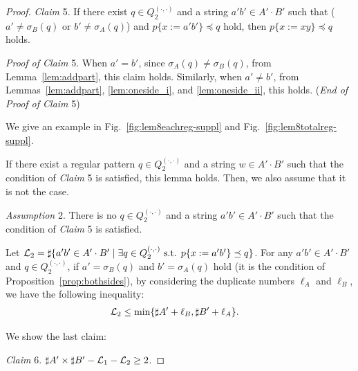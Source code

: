 \begin{proof}
\smallskip

\noindent
\textit{Claim} 5.
If there exist $q \in Q_{2}^{(\cdot,\cdot)}$ and a string $a'b' \in A'\cdot B'$ such that ($a' \not= \sigma_{B}(q)$ or $b' \not= \sigma_{A}(q)$) and $p\{x:=a'b'\} \preceq q$ hold, then $p\{x:=xy\} \preceq q$ holds.
 
\smallskip

\noindent
\textit{Proof of Claim} 5.
When $a'=b'$, since $\sigma_{A}(q) \not= \sigma_{B}(q)$, from Lemma~\ref{lem:addpart}, this claim holds. Similarly, when $a' \not = b'$, from Lemmas~\ref{lem:addpart}, \ref{lem:oneside_i}, and \ref{lem:oneside_ii}, this holds.  (\textit{End of Proof of Claim} 5)

\noindent
We give an example in Fig.~\ref{fig:lem8eachreg-suppl} and Fig.~\ref{fig:lem8totalreg-suppl}.


\smallskip

\noindent
If there exist a regular pattern $q \in Q_{2}^{(\cdot,\cdot)}$ and a string $w \in A'\cdot B'$ such that the condition of \textit{Claim} 5 is satisfied, this lemma holds. Then, we also assume that it is not the case.

\smallskip

\noindent
\textit{Assumption} 2.
There is no $q \in Q_{2}^{(\cdot,\cdot)}$ and a string $a'b' \in A'\cdot B'$ such that the condition of \textit{Claim} 5 is satisfied.

\smallskip

\noindent
Let ${\cal L}_{2} = \sharp\{a'b' \in A'\cdot B' \mid \exists q \in Q_{2}^{(\cdot,\cdot)} \mbox{ s.t. } p\{x:=a'b'\} \preceq q\}$.
For any $a'b' \in A'\cdot B'$ and $q \in Q_{2}^{(\cdot,\cdot)}$, if $a' = \sigma_{B}(q)$ and $b' = \sigma_{A}(q)$ hold (it is the condition of Proposition~\ref{prop:bothsides}), by considering the duplicate numbers $\ell_{A}$ and $\ell_{B}$, we have the following inequality:
\begin{align*}
  {\cal L}_{2} &\leq \min\{\sharp A' + \ell_{B}, \sharp B' + \ell_{A}\}.
\end{align*}

We show the last claim:
  
\smallskip

\noindent
\textit{Claim} 6. 
$\sharp A' \times \sharp B' - {\cal L}_{1} - {\cal L}_{2} \geq 2$.

\smallskip


\end{proof}
